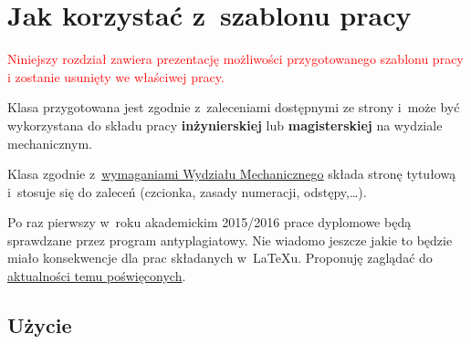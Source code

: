 
\chapter{Jak korzystać z~szablonu pracy}

\textcolor{red}{
    Niniejszy rozdział zawiera prezentację możliwości przygotowanego szablonu pracy
    i zostanie usunięty we właściwej pracy.
}

Klasa przygotowana jest zgodnie z~zaleceniami dostępnymi ze strony \url{} i~może być wykorzystana do składu pracy \textbf{inżynierskiej} lub \textbf{magisterskiej} na wydziale mechanicznym.

Klasa zgodnie z~\href{http://www.wmech.pwr.wroc.pl/88428.dhtml}{wymaganiami Wydziału Mechanicznego} składa stronę tytułową i~stosuje się do zaleceń (czcionka, zasady numeracji, odstępy,\ldots).

Po raz pierwszy w~roku akademickim 2015/2016 prace dyplomowe będą sprawdzane przez program antyplagiatowy. Nie wiadomo jeszcze jakie to będzie miało konsekwencje dla prac składanych w~LaTeXu. Proponuję zaglądać do \href{http://kmim.wm.pwr.edu.pl/myszka/tag/antyplagiat/}{aktualności temu poświęconych}.

\section{Użycie}

